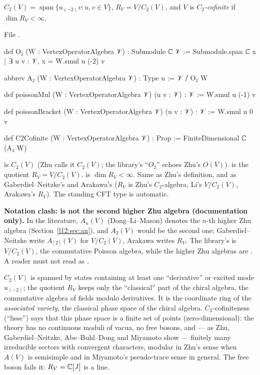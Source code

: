 \begin{definition}\label{l12:def:c2}
$C_2(V) = \operatorname{span}\{u_{(-2)}v : u,v\in V\}$, $R_V = V/C_2(V)$, and $V$ is \emph{$C_2$-cofinite} if
$\dim R_V<\infty$.
\end{definition}
\noindent File .
\begin{leancode}
def O₂ (W : VertexOperatorAlgebra 𝒱) : Submodule ℂ 𝒱 :=
  Submodule.span ℂ {x | ∃ u v : 𝒱, x = W.smul u (-2) v}

abbrev A₂ (W : VertexOperatorAlgebra 𝒱) : Type u := 𝒱 ⧸ O₂ W

def poissonMul (W : VertexOperatorAlgebra 𝒱) (u v : 𝒱) : 𝒱 := W.smul u (-1) v

def poissonBracket (W : VertexOperatorAlgebra 𝒱) (u v : 𝒱) : 𝒱 := W.smul u 0 v

def C2Cofinite (W : VertexOperatorAlgebra 𝒱) : Prop := FiniteDimensional ℂ (A₂ W)
\end{leancode}

\begin{dictionary}
 is $C_2(V)$ (Zhu calls it $C_2(V)$; the library's ``$O_2$'' echoes Zhu's $O(V)$).  is the
quotient $R_V = V/C_2(V)$.  is $\dim R_V<\infty$. Same as Zhu's definition, and as
Gaberdiel--Neitzke's and Arakawa's ($R_V$ is Zhu's $C_2$-algebra, Li's $V/C_2(V)$, Arakawa's
$R_V$). The standing CFT type is automatic.
\end{dictionary}

\begin{warning}
\textbf{Notation clash:  is not the second higher Zhu algebra (documentation only).} In the literature, $A_n(V)$
(Dong--Li--Mason) denotes the $n$-th higher Zhu algebra (Section~\ref{l12:sec:an}), and $A_2(V)$ would be the
second one; Gaberdiel--Neitzke write $A_{[2]}(V)$ for $V/C_2(V)$, Arakawa writes $R_V$. The library's
 is $V/C_2(V)$, the commutative Poisson algebra, while the higher Zhu algebras are . A
reader must not read  as .
\end{warning}

\begin{physics}
$C_2(V)$ is spanned by states containing at least one ``derivative'' or excited mode $u_{(-2)}$; the quotient
$R_V$ keeps only the ``classical'' part of the chiral algebra, the commutative algebra of fields modulo
derivatives. It is the coordinate ring of the \emph{associated variety}, the classical phase space of the chiral
algebra. $C_2$-cofiniteness (``lisse'') says that this phase space is a finite set of points (zero-dimensional):
the theory has no continuous moduli of vacua, no free bosons, and --- as Zhu, Gaberdiel--Neitzke, Abe--Buhl--Dong
and Miyamoto show --- finitely many irreducible sectors with convergent characters, modular in Zhu's sense when $A(V)$ is
semisimple and in Miyamoto's pseudo-trace sense in general. The free boson
fails it: $R_V = {\mathbb{C}}[J]$ is a line.
\end{physics}

